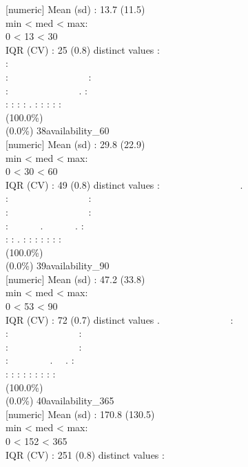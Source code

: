 \documentclass[
  journal,
]{IEEEtran}%
\begin{document}
{[}numeric{]} \textbar Mean (sd) : 13.7 (11.5)\\
min \textless{} med \textless{} max:\\
0 \textless{} 13 \textless{} 30\\
IQR (CV) : 25 (0.8)  distinct values \textbar{} \textbar:\\
:\\
: ~~~~~~~~~~~~~~~~:\\
: ~~~~~~~~~~~~~~. :\\
: : : : . : : : : : \\
(100.0\%) \\
(0.0\%) \textbar{} \textbar{} 38\textbar availability\_60\\
{[}numeric{]} \textbar Mean (sd) : 29.8 (22.9)\\
min \textless{} med \textless{} max:\\
0 \textless{} 30 \textless{} 60\\
IQR (CV) : 49 (0.8)  distinct values \textbar{} \textbar:
~~~~~~~~~~~~~~~~.\\
: ~~~~~~~~~~~~~~~~:\\
: ~~~~~~~~~~~~~~~~:\\
: ~~~~~~. ~~~~~~. :\\
: : . : : : : : : : \\
(100.0\%) \\
(0.0\%) \textbar{} \textbar{} 39\textbar availability\_90\\
{[}numeric{]} \textbar Mean (sd) : 47.2 (33.8)\\
min \textless{} med \textless{} max:\\
0 \textless{} 53 \textless{} 90\\
IQR (CV) : 72 (0.7)  distinct values \textbar{} \textbar.
~~~~~~~~~~~~~~:\\
: ~~~~~~~~~~~~~~:\\
: ~~~~~~~~~~~~~~:\\
: ~~~~~~~~. ~~. :\\
: : : : : : : : : \\
(100.0\%) \\
(0.0\%) \textbar{} \textbar{} 40\textbar availability\_365\\
{[}numeric{]} \textbar Mean (sd) : 170.8 (130.5)\\
min \textless{} med \textless{} max:\\
0 \textless{} 152 \textless{} 365\\
IQR (CV) : 251 (0.8)  distinct values \textbar{} \textbar:\\
\end{document}
